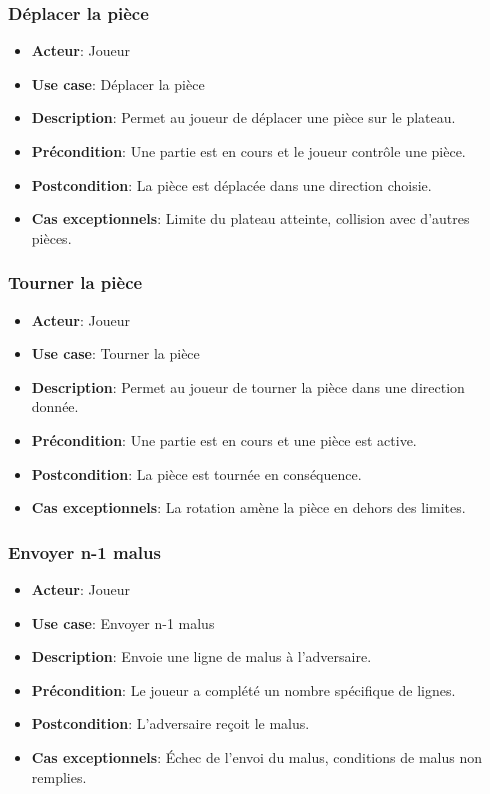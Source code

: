 \documentclass{article}
\begin{document}
\subsubsection{Déplacer la pièce}
\begin{itemize}
    \item \textbf{Acteur}: Joueur
    \item \textbf{Use case}: Déplacer la pièce
    \item \textbf{Description}: Permet au joueur de déplacer une pièce sur le plateau.
    \item \textbf{Précondition}: Une partie est en cours et le joueur contrôle une pièce.
    \item \textbf{Postcondition}: La pièce est déplacée dans une direction choisie.
    \item \textbf{Cas exceptionnels}: Limite du plateau atteinte, collision avec d'autres pièces.
\end{itemize}

\subsubsection{Tourner la pièce}
\begin{itemize}
    \item \textbf{Acteur}: Joueur
    \item \textbf{Use case}: Tourner la pièce
    \item \textbf{Description}: Permet au joueur de tourner la pièce dans une direction donnée.
    \item \textbf{Précondition}: Une partie est en cours et une pièce est active.
    \item \textbf{Postcondition}: La pièce est tournée en conséquence.
    \item \textbf{Cas exceptionnels}: La rotation amène la pièce en dehors des limites.
\end{itemize}

\subsubsection{Envoyer n-1 malus}
\begin{itemize}
    \item \textbf{Acteur}: Joueur
    \item \textbf{Use case}: Envoyer n-1 malus
    \item \textbf{Description}: Envoie une ligne de malus à l'adversaire.
    \item \textbf{Précondition}: Le joueur a complété un nombre spécifique de lignes.
    \item \textbf{Postcondition}: L'adversaire reçoit le malus.
    \item \textbf{Cas exceptionnels}: Échec de l’envoi du malus, conditions de malus non remplies.
\end{itemize}
\end{document}
